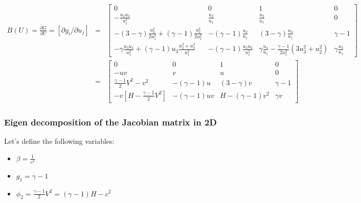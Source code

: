 \documentclass{article}
\begin{document}
\begin{eqnarray}
  B(U) = \frac{\partial G}{\partial U} = \left[ \partial g_i/\partial u_j \right] & = & \left[
    \begin{array}{cccc}
      0 & 0 & 1 & 0\\
      -\frac{u_2 u_3}{u_1^2} & \frac{u_3}{u_1} & \frac{u_2}{u_1} & 0\\
      -(3-\gamma)\frac{u_3^2}{2 u_1^2} + (\gamma-1)\frac{u_2^2}{2 u_1^2} & -(\gamma-1)\frac{u_2}{u_1} & (3-\gamma) \frac{u_3}{u_1} & \gamma-1\\
       -\gamma\frac{u_3 u_4}{u_1^2} + (\gamma-1)u_3 \frac{u_2^2+u_3^2}{u_1^3} & -(\gamma-1)\frac{u_3 u_2}{u_1^2} & \gamma \frac{u_4}{u_1} -\frac{\gamma-1}{2 u_1^2} (3u_3^2+u_2^2) &\gamma \frac{u_3}{u_1}
    \end{array}
  \right]\\
  &=& \left[
    \begin{array}{cccc}
      0 & 0 & 1 & 0\\
      -u v & v & u & 0\\
      \frac{\gamma-1}{2}V^2-v^2 & -(\gamma-1)u  & (3-\gamma) v & \gamma-1\\
      - v [H-\frac{\gamma-1}{2} V^2 ] & -(\gamma-1)uv & H-(\gamma-1)v^2 &\gamma v
    \end{array}
  \right]
\end{eqnarray}

\subsubsection{Eigen decomposition of the Jacobian matrix in 2D}

Let's define the following variables: 
\begin{itemize}
\item $\beta = \frac{1}{c^2}$
\item $g_1 = \gamma-1$
\item $\phi_2 = \frac{\gamma-1}{2}V^2 = (\gamma-1) H - c^2$
\end{itemize}
\end{document}
